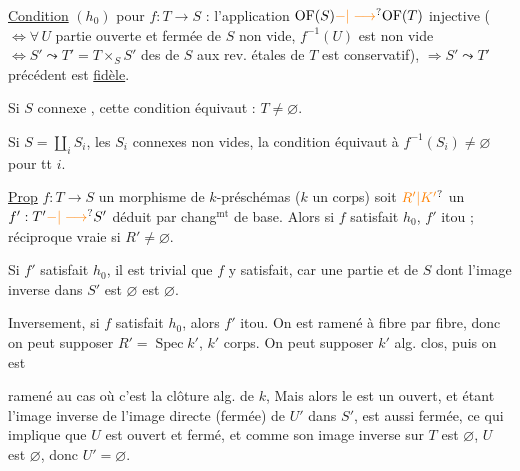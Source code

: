 \uline{Condition}  $(h_0)$ pour $f:T\longrightarrow S$ : l'application $\mathrm{OF}(S)\unsure{-|\longrightarrow}\mathrm{OF}(T)$ injective ($\Longleftrightarrow\forall\,U$ partie ouverte et fermée de $S$ non vide, $f^{-1}(U)$ est non vide $\Longleftrightarrow S'\leadsto T'=T\times_S S'$ des  de $S$ aux rev. étales de $T$ est  conservatif\deleted{\unsure{)}}), $\Longrightarrow S'\leadsto T'$ précédent est \uline{fidèle}.

Si $S$ connexe \inserted{$\ne\varnothing$}, cette condition équivaut : $T\ne\varnothing$.

Si $S=\coprod\limits_i S_i$, les $S_i$ connexes non vides, la condition équivaut à $f^{-1}(S_i)\ne\varnothing$ pour tt $i$.


\uline{Prop}   $f:T\longrightarrow S$  un morphisme de $k$-préschémas ($k$ un corps) soit $\unsure{R'|K'}$ un   $f':T'\unsure{-|\longrightarrow}S'$ déduit par chang$^{\mathrm{mt}}$ de base. Alors si $f$ satisfait $h_0$,  $f'$  itou ; réciproque vraie si $R'\ne\varnothing$.

Si $f'$ satisfait $h_0$,  il est trivial que $f$ y satisfait, car  une partie   et   de $S$ dont l'image inverse dans $S'$ est $\varnothing$ est $\varnothing$.

Inversement, si $f$ satisfait $h_0$, alors $f'$ itou. On est ramené à  fibre par fibre, donc on peut supposer $R'=\operatorname{Spec}k'$, $k'$ corps. On peut supposer $k'$ alg. clos, puis on est

ramené au cas où c'est la clôture alg. de $k$, Mais alors  le   est un ouvert, et étant l'image inverse de l'image directe (fermée)  de $U'$ dans $S'$, est aussi fermée, ce qui implique que $U$ est  ouvert et fermé, et comme son image inverse sur $T$ est $\varnothing$, $U$ est $\varnothing$, donc $U'=\varnothing$.

